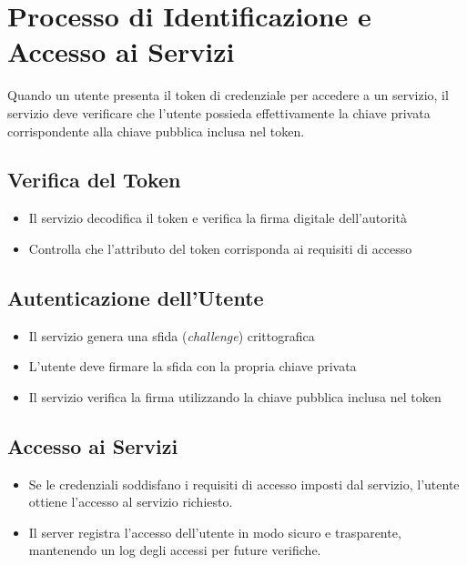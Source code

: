     \section{Processo di Identificazione e Accesso ai Servizi}
        Quando un utente presenta il token di credenziale per accedere a un servizio, il servizio deve verificare che l'utente possieda effettivamente la chiave privata corrispondente alla chiave pubblica inclusa nel token.

        \subsection{Verifica del Token}
            \begin{itemize}
                \item Il servizio decodifica il token e verifica la firma digitale dell'autorità

                \item Controlla che l'attributo del token corrisponda ai requisiti di accesso
            \end{itemize}

        \subsection{Autenticazione dell'Utente}
            \begin{itemize}
                \item Il servizio genera una sfida (\textit{challenge}) crittografica

                \item L'utente deve firmare la sfida con la propria chiave privata

                \item Il servizio verifica la firma utilizzando la chiave pubblica inclusa nel token
            \end{itemize}
    
        \subsection{Accesso ai Servizi}
            \begin{itemize}
                \item Se le credenziali soddisfano i requisiti di accesso imposti dal servizio, l'utente ottiene l'accesso al servizio richiesto.
                
                \item Il server registra l'accesso dell'utente in modo sicuro e trasparente, mantenendo un log degli accessi per future verifiche.
            \end{itemize}


